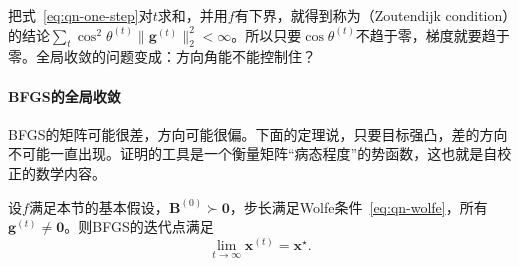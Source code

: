 把式~\eqref{eq:qn-one-step}对$t$求和，并用$f$有下界，就得到称为（Zoutendijk condition）的结论$\sum_t\cos^2\theta^{(t)}\lVert\bm{g}^{(t)}\rVert_2^2<\infty$。所以只要$\cos\theta^{(t)}$不趋于零，梯度就要趋于零。全局收敛的问题变成：方向角能不能控制住？

\paragraph{BFGS的全局收敛}
BFGS的矩阵可能很差，方向可能很偏。下面的定理说，只要目标强凸，差的方向不可能一直出现。证明的工具是一个衡量矩阵“病态程度”的势函数，这也就是自校正的数学内容。

\begin{theorem}[BFGS在强凸目标上的全局收敛]
\label{thm:qn-bfgs-global}
设$f$满足本节的基本假设，$\bm{B}^{(0)}\succ\bm{0}$，步长满足Wolfe条件~\eqref{eq:qn-wolfe}，所有$\bm{g}^{(t)}\neq\bm{0}$。则BFGS的迭代点满足
\begin{equation}
 \lim_{t\to\infty}\bm{x}^{(t)}=\bm{x}^\star.
 \label{eq:qn-bfgs-global}
\end{equation}
\end{theorem}

